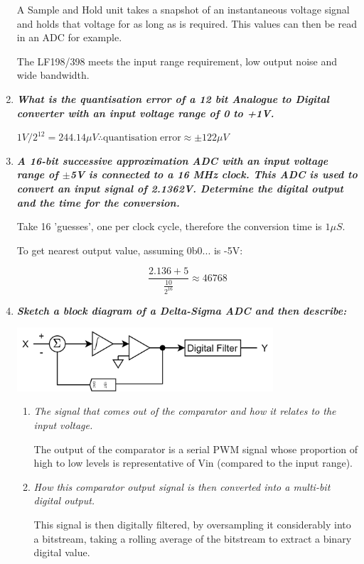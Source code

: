 \documentclass[11pt]{article}
\begin{document}
\begin{preview}
\begin{enumerate}
              A Sample and Hold unit takes a snapshot of an instantaneous voltage signal and holds that voltage for as long as is required. This values can then be read in an ADC for example.

              The LF198/398 meets the input range requirement, low output noise and wide bandwidth.

        \item \textit{\textbf{What is the quantisation error of a 12 bit Analogue to Digital converter with an input voltage range of 0 to +1V.}}

              $1V/2^{12}=244.14 \mu V \therefore \mathrm{quantisation \; error} \approx \pm 122 \mu V$

        \item \textit{\textbf{A 16-bit successive approximation ADC with an input voltage range of $\pm$5V is connected to a 16 MHz clock. This ADC is used to convert an input signal of 2.1362V. Determine the digital output and the time for the conversion.}}

              Take 16 'guesses', one per clock cycle, therefore the conversion time is $1\mu S$.

              To get nearest output value, assuming 0b0... is -5V:

              $$\frac{2.136+5}{\frac{10}{2^{16}}} \approx 46768$$

        \item \textit{\textbf{Sketch a block diagram of a Delta-Sigma ADC and then describe:}}

              \begin{center}
                  \includegraphics[width=0.75\textwidth]{inc/del-sig.png}
              \end{center}

              \begin{enumerate}
                  \item \textit{The signal that comes out of the comparator and how it relates to the input voltage.}

                        The output of the comparator is a serial PWM signal whose proportion of high to low levels is representative of Vin (compared to the input range).

                  \item \textit{How this comparator output signal is then converted into a multi-bit digital output.}

                        This signal is then digitally filtered, by oversampling it considerably into a bitstream, taking a rolling average of the bitstream to extract a binary digital value.

              \end{enumerate}
    \end{enumerate}

\end{preview}
\end{document}

